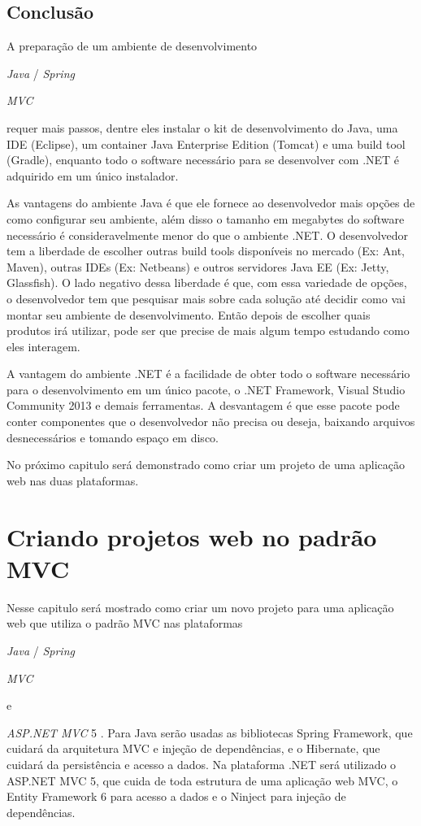 \documentclass[a4paper,12pt]{article}
\newcommand{\anmvc} {
	\sigla{ASP.NET MVC} 5
}
\newcommand{\spring} {
	\lang{Java}/\est{Spring} \sigla{MVC}
}
\newcommand{\est}[1] {
	\textit{#1}
}
\newcommand{\sigla}[1] {
	\textit{#1}
}
\newcommand{\lang}[1] {
	\textit{#1}
}
\begin{document}
\subsection{Conclusão}

A preparação de um ambiente de desenvolvimento \spring requer mais passos, dentre eles instalar o kit de desenvolvimento do Java, uma IDE (Eclipse), um container Java Enterprise Edition (Tomcat) e uma build tool (Gradle), enquanto  todo o software necessário para se desenvolver com .NET é adquirido em um único instalador.

As vantagens do ambiente Java é que ele fornece ao desenvolvedor mais opções de como configurar seu ambiente, além disso o tamanho em megabytes do software necessário é consideravelmente menor do que o ambiente .NET. O desenvolvedor tem a liberdade de escolher outras build tools disponíveis no mercado (Ex: Ant, Maven), outras IDEs (Ex: Netbeans) e outros servidores Java EE (Ex: Jetty, Glassfish). O lado negativo dessa liberdade é que, com  essa variedade de opções, o desenvolvedor tem que pesquisar mais sobre cada solução até decidir como vai montar seu ambiente de desenvolvimento. Então depois de escolher quais produtos irá utilizar, pode ser que precise de mais algum tempo estudando como eles interagem.

A vantagem do ambiente .NET é a facilidade de obter todo o software necessário para o desenvolvimento em um único pacote, o .NET Framework, Visual Studio Community 2013 e demais ferramentas. A desvantagem é que esse pacote pode conter componentes que o desenvolvedor não precisa ou deseja, baixando arquivos desnecessários e tomando espaço em disco.

No próximo capitulo será demonstrado como criar um projeto de uma aplicação web nas duas plataformas.

\section{Criando projetos web no padrão MVC}

Nesse capitulo será mostrado como criar um novo projeto para uma aplicação web que utiliza o padrão MVC nas plataformas \spring e \anmvc. Para Java serão usadas as bibliotecas Spring Framework, que cuidará da arquitetura MVC e injeção de dependências, e o Hibernate, que cuidará da persistência e acesso a dados. Na plataforma .NET será utilizado o ASP.NET MVC 5, que cuida de toda estrutura de uma aplicação web MVC, o Entity Framework 6 para acesso a dados e o Ninject para injeção de dependências.
\end{document}

